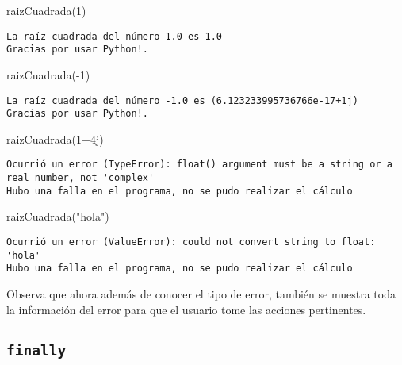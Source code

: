 \documentclass[
  letterpaper,
  DIV=11,
  numbers=noendperiod]{scrreprt}
\newenvironment{Shaded}{\begin{snugshade}}{\end{snugshade}}
\newcommand{\DecValTok}[1]{\textcolor[rgb]{0.68,0.00,0.00}{#1}}
\newcommand{\NormalTok}[1]{\textcolor[rgb]{0.00,0.23,0.31}{#1}}
\newcommand{\OperatorTok}[1]{\textcolor[rgb]{0.37,0.37,0.37}{#1}}
\newcommand{\OtherTok}[1]{\textcolor[rgb]{0.00,0.23,0.31}{#1}}
\newcommand{\StringTok}[1]{\textcolor[rgb]{0.13,0.47,0.30}{#1}}
\begin{document}
\begin{Shaded}
\begin{Highlighting}[]
\NormalTok{raizCuadrada(}\DecValTok{1}\NormalTok{)}
\end{Highlighting}
\end{Shaded}

\begin{verbatim}
La raíz cuadrada del número 1.0 es 1.0
Gracias por usar Python!.
\end{verbatim}

\begin{Shaded}
\begin{Highlighting}[]
\NormalTok{raizCuadrada(}\OperatorTok{{-}}\DecValTok{1}\NormalTok{)}
\end{Highlighting}
\end{Shaded}

\begin{verbatim}
La raíz cuadrada del número -1.0 es (6.123233995736766e-17+1j)
Gracias por usar Python!.
\end{verbatim}

\begin{Shaded}
\begin{Highlighting}[]
\NormalTok{raizCuadrada(}\DecValTok{1}\OperatorTok{+}\OtherTok{4j}\NormalTok{)}
\end{Highlighting}
\end{Shaded}

\begin{verbatim}
Ocurrió un error (TypeError): float() argument must be a string or a real number, not 'complex'
Hubo una falla en el programa, no se pudo realizar el cálculo
\end{verbatim}

\begin{Shaded}
\begin{Highlighting}[]
\NormalTok{raizCuadrada(}\StringTok{"hola"}\NormalTok{)}
\end{Highlighting}
\end{Shaded}

\begin{verbatim}
Ocurrió un error (ValueError): could not convert string to float: 'hola'
Hubo una falla en el programa, no se pudo realizar el cálculo
\end{verbatim}

Observa que ahora además de conocer el tipo de error, también se muestra
toda la información del error para que el usuario tome las acciones
pertinentes.

\subsection{\texorpdfstring{\texttt{finally}}{finally}}\label{finally}
\end{document}
